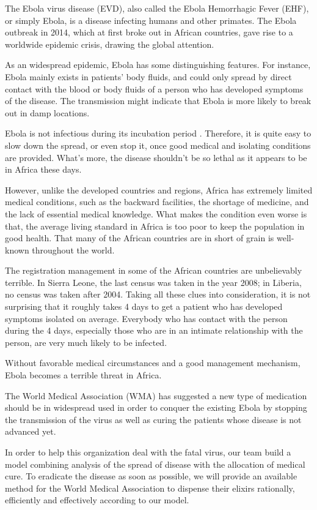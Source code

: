 \documentclass[12pt]{article}
\begin{document}
The Ebola virus disease (EVD), also called the Ebola Hemorrhagic Fever (EHF), or simply Ebola, is a disease infecting humans and other primates. The Ebola outbreak in 2014, which at first broke out in African countries, gave rise to a worldwide epidemic crisis, drawing the global attention.

As an widespread epidemic, Ebola has some distinguishing features. For instance, Ebola mainly exists in patients' body fluids, and could only spread by direct contact with the blood or body fluids of a person who has developed symptoms of the disease. The transmission might indicate that Ebola is more likely to break out in damp locations. 

Ebola is not infectious during its incubation period \cite{pmid25373801, Transmission, pmid25347231}. 
Therefore, it is quite easy to slow down the spread, or even stop it, once good medical and isolating conditions are provided. What's more, the disease shouldn't be so lethal as it appears to be in Africa these days.

However, unlike the developed countries and regions, Africa has extremely limited medical conditions, such as the backward facilities, the shortage of medicine, and the lack of essential medical knowledge. What makes the condition even worse is that, the average living standard in Africa is too poor to keep the population in good health. That many of the African countries are in short of grain is well-known throughout the world.

The registration management in some of the African countries are unbelievably terrible. In Sierra Leone, the last census was taken in the year 2008; in Liberia, no census was taken after 2004. Taking all these clues into consideration, it is not surprising that it roughly takes 4 days \cite{Sitrep} to get a patient who has developed symptoms isolated on average. Everybody who has contact with the person during the 4 days, especially those who are in an intimate relationship with the person, are very much likely to be infected.

Without favorable medical circumstances and a good management mechanism, Ebola becomes a terrible threat in Africa.

The World Medical Association (WMA) has suggested a new type of medication should be in widespread used in order to conquer the existing Ebola by stopping the transmission of the virus as well as curing the patients whose disease is not advanced yet. 

In order to help this organization deal with the fatal virus, our team build a model combining analysis of the spread of disease with the allocation of medical cure. To eradicate the disease as soon as possible, we will provide an available method for the World Medical Association to dispense their elixirs rationally, efficiently and effectively according to our model.
\end{document}
